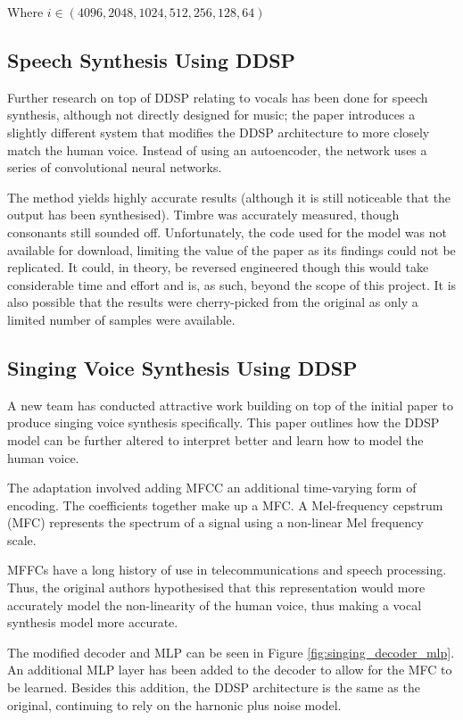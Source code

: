 Where $i \in (4096, 2048, 1024, 512, 256, 128, 64)$

\subsection{Speech Synthesis Using DDSP}

Further research on top of DDSP relating to vocals has been done for speech synthesis, although not directly designed for music; the paper introduces a slightly different system that modifies the DDSP architecture to more closely match the human voice\cite{SpeechDDSP}. Instead of using an autoencoder, the network uses a series of convolutional neural networks.

The method yields highly accurate results (although it is still noticeable that the output has been synthesised). Timbre was accurately measured, though consonants still sounded off. Unfortunately, the code used for the model was not available for download, limiting the value of the paper as its findings could not be replicated. It could, in theory, be reversed engineered though this would take considerable time and effort and is, as such, beyond the scope of this project. It is also possible that the results were cherry-picked from the original as only a limited number of samples were available.

\subsection{Singing Voice Synthesis Using DDSP}
\label{sec:singing_voice_synthesis}

A new team has conducted attractive work building on top of the initial paper to produce singing voice synthesis\cite{SingingDDSP} specifically. This paper outlines how the DDSP model can be further altered to interpret better and learn how to model the human voice.

The adaptation involved adding \acrfull{MFCC} an additional time-varying form of encoding. The coefficients together make up a \acrfull{MFC}. A Mel-frequency cepstrum (MFC) represents the spectrum of a signal using a non-linear Mel frequency scale.

MFFCs have a long history of use in telecommunications and speech processing\cite{MFCCHistory}. Thus, the original authors hypothesised that this representation would more accurately model the non-linearity of the human voice, thus making a vocal synthesis model more accurate.

The modified decoder and MLP can be seen in Figure \ref{fig:singing_decoder_mlp}. An additional MLP layer has been added to the decoder to allow for the MFC to be learned. Besides this addition, the DDSP architecture is the same as the original, continuing to rely on the harnonic plus noise model.

